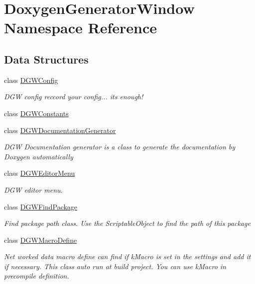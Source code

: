 \hypertarget{namespaceDoxygenGeneratorWindow}{}\section{Doxygen\+Generator\+Window Namespace Reference}
\label{namespaceDoxygenGeneratorWindow}
\subsection*{Data Structures}
\begin{DoxyCompactItemize}
\item 
class \hyperlink{classDoxygenGeneratorWindow_1_1DGWConfig}{D\+G\+W\+Config}
\begin{DoxyCompactList}\small\item\em D\+GW config reccord your config... it\textquotesingle{}s enough! \end{DoxyCompactList}\item 
class \hyperlink{classDoxygenGeneratorWindow_1_1DGWConstants}{D\+G\+W\+Constants}
\item 
class \hyperlink{classDoxygenGeneratorWindow_1_1DGWDocumentationGenerator}{D\+G\+W\+Documentation\+Generator}
\begin{DoxyCompactList}\small\item\em D\+GW Documentation generator is a class to generate the documentation by Doxygen automatically \end{DoxyCompactList}\item 
class \hyperlink{classDoxygenGeneratorWindow_1_1DGWEditorMenu}{D\+G\+W\+Editor\+Menu}
\begin{DoxyCompactList}\small\item\em D\+GW editor menu. \end{DoxyCompactList}\item 
class \hyperlink{classDoxygenGeneratorWindow_1_1DGWFindPackage}{D\+G\+W\+Find\+Package}
\begin{DoxyCompactList}\small\item\em Find package path class. Use the Scriptable\+Object to find the path of this package \end{DoxyCompactList}\item 
class \hyperlink{classDoxygenGeneratorWindow_1_1DGWMacroDefine}{D\+G\+W\+Macro\+Define}
\begin{DoxyCompactList}\small\item\em Net worked data macro define can find if k\+Macro is set in the settings and add it if necessary. This class auto run at build project. You can use k\+Macro in precompile definition. \end{DoxyCompactList}\end{DoxyCompactItemize}
